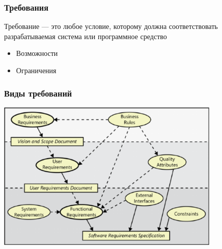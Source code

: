 \documentclass{../../slides-style}
\begin{document}
    \begin{frame}[plain]
        \titlepage
    \end{frame}

    \begin{frame}
        \frametitle{Требования}
        Требование --- это любое условие, которому должна соответствовать разрабатываемая система или программное средство
        \begin{itemize}
            \item Возможности
            \item Ограничения
        \end{itemize}
    \end{frame}

    \begin{frame}
        \frametitle{Виды требований}
        \begin{center}
            \includegraphics[width=0.8\textwidth]{requirements.png}
        \end{center}
    \end{frame}
\end{document}
